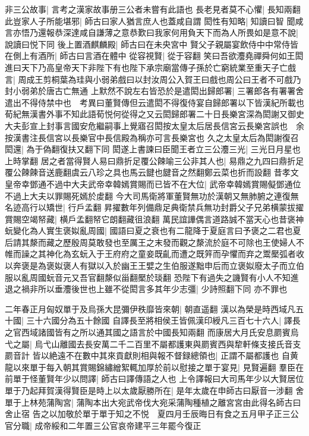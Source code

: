 非三公故事|{
	言考之漢家故事册三公者未嘗有此語也}
長老見者莫不心懼|{
	長知兩翻}
此豈家人子所能堪邪|{
	師古曰家人猶言庶人也蓋咸自謂}
閎性有知略|{
	知讀曰智}
聞咸言亦悟乃還報恭深達咸自謙薄之意恭歎曰我家何用負天下而為人所畏如是意不說|{
	說讀曰悦下同}
後上置酒麒麟殿|{
	師古曰在未央宮中}
賢父子親屬宴飲侍中中常侍皆在側上有酒所|{
	師古曰言酒在體中}
從容視賢|{
	從于容翻}
笑曰吾欲灋堯禪舜何如王閎進曰天下乃高皇帝天下非陛下有也陛下承宗廟當傳子孫於亡窮統業至重天子亡戲言|{
	周成王剪桐葉為珪與小弱弟戲曰以封汝周公入賀王曰戲也周公曰王者不可戲乃封小弱弟於唐古亡無通}
上默然不說左右皆恐於是遣閎出歸郎署|{
	三署郎各有署署舍遣出不得侍禁中也　考異曰董賢傳但云遣閎不得復侍宴自歸郎署以下皆漢紀所載也荀紀無漢書外事不知此語荀悦何從得之又云閎歸郎署二十日長樂宮深為閎謝又御史大夫彭宣上封事言國安危繼嗣事上覺寤召閎按太皇太后居長信宮云長樂宮誤也　余按漢書注長信宮以長樂官中長信殿為稱亦可言長樂宮也}
久之太皇太后為閎謝復召閎還|{
	為于偽翻復扶又翻下同}
閎遂上書諫曰臣聞王者立三公灋三光|{
	三光日月星也上時掌翻}
居之者當得賢人易曰鼎折足覆公餗喻三公非其人也|{
	易鼎之九四曰鼎折足覆公餗餗音送鹿翻虞云八珍之具也馬云䭈也䭈音之然翻鄭云菜也折而設翻}
昔孝文皇帝幸鄧通不過中大夫武帝幸韓嫣賞賜而已皆不在大位|{
	武帝幸韓嫣賞賜儗鄧通位不過上大夫以罪賜死嫣於䖍翻}
今大司馬衛將軍董賢無功於漢朝又無肺腑之連復無名迹高行以矯世|{
	行戶孟翻}
昇擢數年列備鼎足典衛禁兵無功封爵父子兄弟横蒙拔擢賞賜空竭帑藏|{
	横戶孟翻帑它朗翻藏徂浪翻}
萬民誼譁偶言道路誠不當天心也昔褒神蚖變化為人實生褒姒亂周國|{
	國語曰夏之衰也有二龍降于夏庭言曰予褒之二君也夏后請其漦而藏之歷殷周莫敢發也至厲王之末發而觀之漦流於庭不可除也王使婦人不帷而譟之其神化為玄蚖入于王府府之童妾既齓而遭之既笄而孕懼而弃之鬻檿弧者收以奔褒是為褒姒褒人有獄以入於幽王王嬖之生伯服遂黜申后而立褒姒廢太子而立伯服以亂周國蚖音元又吾官翻漦似甾翻檿於琰翻}
恐陛下有過失之譏賢有小人不知進退之禍非所以垂灋後世也上雖不從閎言多其年少志彊|{
	少詩照翻下同}
亦不罪也

二年春正月匈奴單于及烏孫大昆彌伊秩靡皆來朝|{
	朝直遥翻}
漢以為榮是時西域凡五十國|{
	三十六國分為五十餘國}
自譯長至將相侯王皆佩漢印綬凡三百七十六人|{
	譯長之官西域諸國皆有之所以通其國之語言於中國長知兩翻}
而康居大月氏安息罽賓烏弋之屬|{
	烏弋山離國去長安萬二千二百里不屬都護東與罽賓西與犂軒條支接氏音支罽音計}
皆以絶遠不在數中其來貢獻則相與報不督録總領也|{
	正謂不屬都護也}
自黄龍以來單于每入朝其賞賜錦繡繒絮輒加厚於前以慰接之單于宴見|{
	見賢遍翻}
羣臣在前單于怪董賢年少以問譯|{
	師古曰譯傳語之人也}
上令譯報曰大司馬年少以大賢居位單于乃起拜賀漢得賢臣是時上以太歲厭勝所在|{
	是年太歲在申師古曰厭音一涉翻}
舍單于上林苑蒲陶宮|{
	蒲陶本出大宛武帝伐大宛采蒲陶種植之離宮宮由此得名師古曰舍止宿}
告之以加敬於單于單于知之不悦　夏四月壬辰晦日有食之五月甲子正三公官分職|{
	成帝綏和二年置三公官哀帝建平三年罷今復正}


